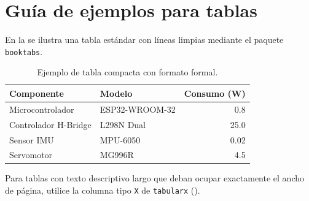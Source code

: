 
\section{Guía de ejemplos para tablas}
\label{sec:ejemplo-tablas}

En la  se ilustra una tabla estándar con líneas limpias mediante el paquete \texttt{booktabs}.

\begin{table}[htbp]
    \centering
    \caption{Ejemplo de tabla compacta con formato formal.}
    \label{tab:ejemplo-simple}
    \begin{tabular}{llr}
        \toprule
        \textbf{Componente} & \textbf{Modelo} & \textbf{Consumo (\unit{\watt})} \\
        \midrule
        Microcontrolador & ESP32-WROOM-32 & 0.8 \\
        Controlador H-Bridge & L298N Dual & 25.0 \\
        Sensor IMU & MPU-6050 & 0.02 \\
        Servomotor & MG996R & 4.5 \\
        \bottomrule
    \end{tabular}
\end{table}

Para tablas con texto descriptivo largo que deban ocupar exactamente el ancho de página, utilice la columna tipo \texttt{X} de \texttt{tabularx} ().

